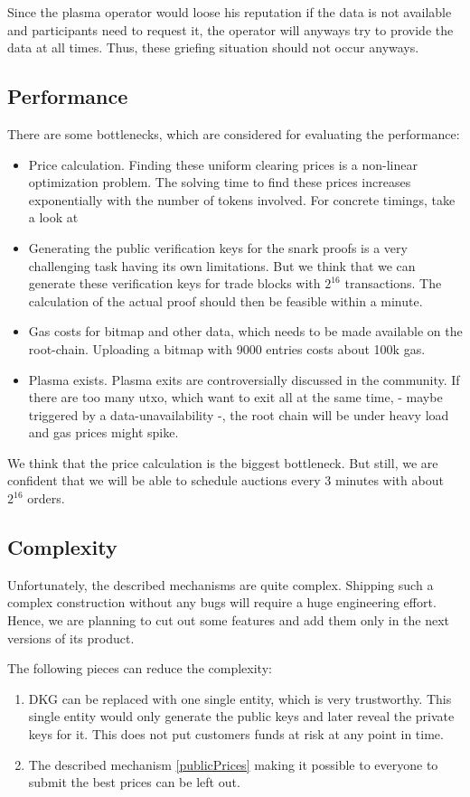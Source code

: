 \documentclass[11pt,parskip=full]{scrartcl}%
\begin{document}
Since the plasma operator would loose his reputation if the data is not available and participants need to request it, the operator will anyways try to provide the data at all times. Thus, these griefing situation should not occur anyways.

\subsection{Performance}
There are some bottlenecks, which are considered for evaluating the performance:
\begin{itemize}
\item Price calculation. 
Finding these uniform clearing prices is a non-linear optimization problem. 
The solving time to find these prices increases exponentially with the number of tokens involved. For concrete timings, take a look at \cite{priceOptimization}
\item Generating the public verification keys for the snark proofs is a very challenging task having its own limitations. 
But we think that we can generate these verification keys for trade blocks with $2^{16}$ transactions. 
The calculation of the actual proof should then be feasible within a minute. 
\item Gas costs for bitmap and other data, which needs to be made available on the root-chain. 
Uploading a bitmap with 9000 entries costs about 100k gas. 
\item Plasma exists.
Plasma exits are controversially discussed in the community. 
If there are too many utxo, which want to exit all at the same time, - maybe triggered by a data-unavailability -, the root chain will be under heavy load and gas prices might spike. 
\end{itemize}
We think that the price calculation is the biggest bottleneck. 
But still, we are confident that we will be able to schedule auctions every 3 minutes with about $2^{16}$ orders. 
\subsection{Complexity}
Unfortunately, the described mechanisms are quite complex. 
Shipping such a complex construction without any bugs will require a huge engineering effort. 
Hence, we are planning to cut out some features and add them only in the next versions of its product. 

The following pieces can reduce the complexity:
\begin{enumerate}
\item
DKG can be replaced with one single entity, which is very trustworthy. 
This single entity would only generate the public keys and later reveal the private keys for it. 
This does not put customers funds at risk at any point in time. 
\item
The described mechanism \ref{publicPrices} making it possible to everyone to submit the best prices can be left out. 
\end{enumerate}
\end{document}
